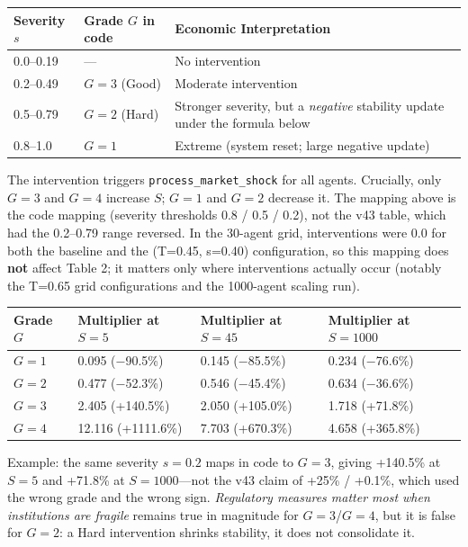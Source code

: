 \documentclass[11pt]{article}
\begin{document}
\begin{table}[htbp]
\centering
\begin{tabular}{lll}
\toprule
\textbf{Severity $s$} & \textbf{Grade $G$ in code} & \textbf{Economic Interpretation} \\
\midrule
0.0--0.19 & --- & No intervention \\
0.2--0.49 & $G=3$ (Good) & Moderate intervention \\
0.5--0.79 & $G=2$ (Hard) & Stronger severity, but a \textit{negative} stability update under the formula below \\
0.8--1.0 & $G=1$ & Extreme (system reset; large negative update) \\
\bottomrule
\end{tabular}
\end{table}

The intervention triggers \texttt{process\_market\_shock} for all agents. Crucially, only $G=3$ and $G=4$ increase $S$; $G=1$ and $G=2$ decrease it. The mapping above is the code mapping (severity thresholds 0.8 / 0.5 / 0.2), not the v43 table, which had the 0.2--0.79 range reversed. In the 30-agent grid, interventions were 0.0 for both the baseline and the (T=0.45, s=0.40) configuration, so this mapping does \textbf{not} affect Table 2; it matters only where interventions actually occur (notably the T=0.65 grid configurations and the 1000-agent scaling run).

\begin{table}[htbp]
\centering
\begin{tabular}{llll}
\toprule
\textbf{Grade $G$} & \textbf{Multiplier at $S=5$} & \textbf{Multiplier at $S=45$} & \textbf{Multiplier at $S=1000$} \\
\midrule
$G=1$ & 0.095 ($-$90.5\%) & 0.145 ($-$85.5\%) & 0.234 ($-$76.6\%) \\
$G=2$ & 0.477 ($-$52.3\%) & 0.546 ($-$45.4\%) & 0.634 ($-$36.6\%) \\
$G=3$ & 2.405 (+140.5\%) & 2.050 (+105.0\%) & 1.718 (+71.8\%) \\
$G=4$ & 12.116 (+1111.6\%) & 7.703 (+670.3\%) & 4.658 (+365.8\%) \\
\bottomrule
\end{tabular}
\end{table}

Example: the same severity $s=0.2$ maps in code to $G=3$, giving +140.5\% at $S=5$ and +71.8\% at $S=1000$---not the v43 claim of +25\% / +0.1\%, which used the wrong grade and the wrong sign. \textit{Regulatory measures matter most when institutions are fragile} remains true in magnitude for $G=3$/$G=4$, but it is false for $G=2$: a Hard intervention shrinks stability, it does not consolidate it.
\end{document}
